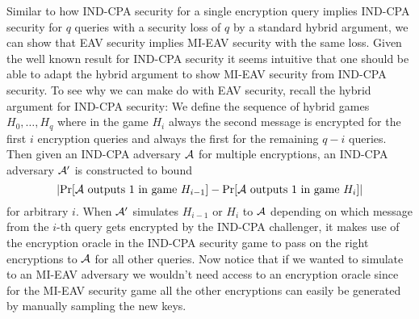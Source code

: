 Similar to how IND-CPA security for a single encryption query implies IND-CPA security for $q$ queries with a security loss of $q$ by a standard hybrid argument, we can show that EAV security implies MI-EAV security with the same loss. Given the well known result for IND-CPA security it seems intuitive that one should be able to adapt the hybrid argument to show MI-EAV security from IND-CPA security. To see why we can make do with EAV security, recall the hybrid argument for IND-CPA security: We define the sequence of hybrid games $H_0, \ldots, H_q$ where in the game $H_i$ always the second message is encrypted for the first $i$ encryption queries and always the first for the remaining $q - i$ queries. Then given an IND-CPA adversary $\mathcal{A}$ for multiple encryptions, an IND-CPA adversary $\mathcal{A}'$ is constructed to bound
\[
	\abs*{\pr{\adv \text{ outputs } 1 \text{ in game } H_{i - 1}} - \pr{\adv \text{ outputs } 1 \text{ in game } H_{i}}}
\]
for arbitrary $i$.
When $\mathcal{A}'$ simulates $H_{i - 1}$ or $H_{i}$ to $\mathcal{A}$ depending on which message from the $i$-th query gets encrypted by the IND-CPA challenger, it makes use of the encryption oracle in the IND-CPA security game to pass on the right encryptions to $\mathcal{A}$ for all other queries. Now notice that if we wanted to simulate to an MI-EAV adversary we wouldn't need access to an encryption oracle since for the MI-EAV security game all the other encryptions can easily be generated by manually sampling the new keys.

